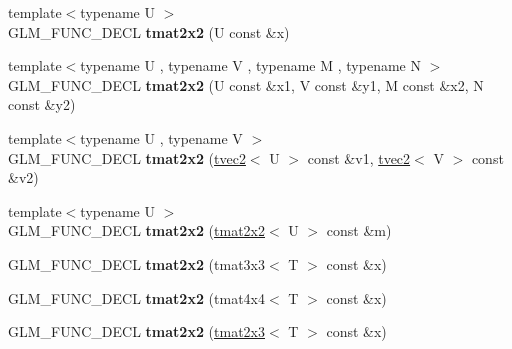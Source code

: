 \begin{DoxyCompactItemize}
\item 
\hypertarget{structglm_1_1detail_1_1tmat2x2_aeb6edeadf2a08e18438d845139c6c0fd}{{\footnotesize template$<$typename U $>$ }\\\-G\-L\-M\-\_\-\-F\-U\-N\-C\-\_\-\-D\-E\-C\-L {\bfseries tmat2x2} (\-U const \&x)}\label{structglm_1_1detail_1_1tmat2x2_aeb6edeadf2a08e18438d845139c6c0fd}

\item 
\hypertarget{structglm_1_1detail_1_1tmat2x2_a6d7150d2d56275f0286fe5bdbf57c004}{{\footnotesize template$<$typename U , typename V , typename M , typename N $>$ }\\\-G\-L\-M\-\_\-\-F\-U\-N\-C\-\_\-\-D\-E\-C\-L {\bfseries tmat2x2} (\-U const \&x1, \-V const \&y1, \-M const \&x2, \-N const \&y2)}\label{structglm_1_1detail_1_1tmat2x2_a6d7150d2d56275f0286fe5bdbf57c004}

\item 
\hypertarget{structglm_1_1detail_1_1tmat2x2_a050865e2f51e62b964feda65c528dc17}{{\footnotesize template$<$typename U , typename V $>$ }\\\-G\-L\-M\-\_\-\-F\-U\-N\-C\-\_\-\-D\-E\-C\-L {\bfseries tmat2x2} (\hyperlink{structglm_1_1detail_1_1tvec2}{tvec2}$<$ \-U $>$ const \&v1, \hyperlink{structglm_1_1detail_1_1tvec2}{tvec2}$<$ \-V $>$ const \&v2)}\label{structglm_1_1detail_1_1tmat2x2_a050865e2f51e62b964feda65c528dc17}

\item 
\hypertarget{structglm_1_1detail_1_1tmat2x2_a585d4b0bc985e4fa2f078000743972bb}{{\footnotesize template$<$typename U $>$ }\\\-G\-L\-M\-\_\-\-F\-U\-N\-C\-\_\-\-D\-E\-C\-L {\bfseries tmat2x2} (\hyperlink{structglm_1_1detail_1_1tmat2x2}{tmat2x2}$<$ \-U $>$ const \&m)}\label{structglm_1_1detail_1_1tmat2x2_a585d4b0bc985e4fa2f078000743972bb}

\item 
\hypertarget{structglm_1_1detail_1_1tmat2x2_ae1edb9d6f575dae334a56cb4e0bc1d30}{\-G\-L\-M\-\_\-\-F\-U\-N\-C\-\_\-\-D\-E\-C\-L {\bfseries tmat2x2} (tmat3x3$<$ \-T $>$ const \&x)}\label{structglm_1_1detail_1_1tmat2x2_ae1edb9d6f575dae334a56cb4e0bc1d30}

\item 
\hypertarget{structglm_1_1detail_1_1tmat2x2_a28b0e13e8cb74488c421f5ed8abc22a3}{\-G\-L\-M\-\_\-\-F\-U\-N\-C\-\_\-\-D\-E\-C\-L {\bfseries tmat2x2} (tmat4x4$<$ \-T $>$ const \&x)}\label{structglm_1_1detail_1_1tmat2x2_a28b0e13e8cb74488c421f5ed8abc22a3}

\item 
\hypertarget{structglm_1_1detail_1_1tmat2x2_a74699d8e40847709fd239f3f6f920ffc}{\-G\-L\-M\-\_\-\-F\-U\-N\-C\-\_\-\-D\-E\-C\-L {\bfseries tmat2x2} (\hyperlink{structglm_1_1detail_1_1tmat2x3}{tmat2x3}$<$ \-T $>$ const \&x)}\label{structglm_1_1detail_1_1tmat2x2_a74699d8e40847709fd239f3f6f920ffc}


\end{DoxyCompactItemize}
